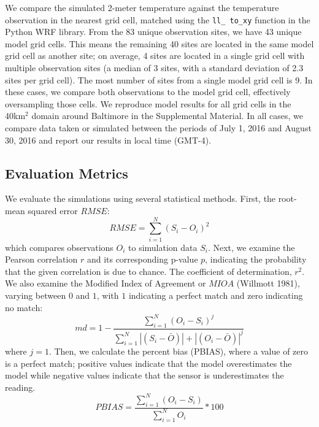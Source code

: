 \documentclass[draft,linenumbers]{agujournal}
\begin{document}
We compare the simulated 2-meter temperature against the temperature observation in the nearest grid cell, matched using the \texttt{ll\_ to\_xy} function in the Python WRF library. 
From the 83 unique observation sites, we have 43 unique model grid cells. This means the remaining 40 sites are located in the same model grid cell as another site; on average, 4 sites are located in a single grid cell with multiple observation sites (a median of 3 sites, with a standard deviation of 2.3 sites per grid cell). The most number of sites from a single model grid cell is 9. In these cases, we compare both observations to the model grid cell, effectively oversampling those cells. 
We reproduce model results for all grid cells in the 40km$^2$ domain around Baltimore in the Supplemental Material. 
In all cases, we compare data taken or simulated between the periods of July 1, 2016 and August 30, 2016 and report our results in local time (GMT-4). 

\subsection{Evaluation Metrics}
We evaluate the simulations using several statistical methods. 
First, the root-mean squared error $RMSE$:  
\begin{equation}%
RMSE = \sum_{i=1}^{N} \left(S_i - O_i\right)^2
\end{equation}
which compares observations $O_i$ to simulation data $S_i$.
Next, we examine the Pearson correlation $r$ and its corresponding p-value $p$, indicating the probability that the given correlation is due to chance. The coefficient of determination, $r^2$. We also examine the Modified Index of Agreement or $MIOA$ (Willmott 1981), varying between \(0\) and \(1\), with \(1\) indicating a perfect match and zero indicating no match: 
\begin{equation}
md = 1 - \frac{\sum_{i=1}^{N}(O_{i}-S_{i})^{j}}{\sum_{i=1}^{N}|(S_{i}-\bar{O})|+|(O_{i}-\bar{O})|^{j}}
\end{equation}
where $j=1$. 
Then, we calculate the percent bias (PBIAS), where a value of zero is a perfect match; positive values indicate that the model overestimates the model while negative values indicate that the sensor is underestimates the reading.
\begin{equation}
PBIAS = \frac{\sum_{i=1}^{N}(O_{i}-S_{i})}{\sum_{i=1}^{N}O_{i}}*100
\end{equation}
\end{document}
